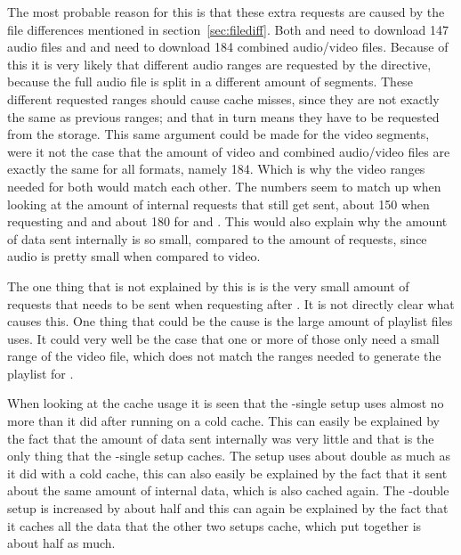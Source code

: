 \documentclass[twoside,openright]{uva-bachelor-thesis}
\begin{document}
The most probable reason for this is that these extra requests
are caused by the file differences mentioned in section~\ref{sec:filediff}.
Both \dash and \iss need to download 147 audio files and \hds and \hls need to
download 184 combined audio/video files. Because of this it is very likely that
different audio ranges are requested by the \ipplong directive, because the full
audio file is split in a different amount of segments. These different requested
ranges should cause cache misses, since they are not exactly the same as
previous ranges; and that in turn means they have to be requested from the
storage. This same argument could be made for the video segments, were it not
the case that the amount of video and combined audio/video files are exactly the
same for all formats, namely 184.  Which is why the video ranges needed for
both would match each other. The numbers seem to match up when looking at the
amount of internal requests that still get sent, about 150 when requesting \dash
and \iss and about 180 for \hds and \hls.  This would also explain why the
amount of data sent internally is so small, compared to the amount of requests,
since audio is pretty small when compared to video.

The one thing that is not explained by this is is the very small amount of
requests that needs to be sent when requesting \hls after \hds. It is not
directly clear what causes this. One thing that could be the cause is the large
amount of playlist files \hls uses. It could very well be the case that one or
more of those only need a small range of the video file, which does not match
the ranges needed to generate the playlist for \hds.

When looking at the cache usage it is seen that the \lt-single setup uses almost
no more than it did after running on a cold cache. This can easily be explained
by the fact that the amount of data sent internally was very little and that is
the only thing that the \lt-single setup caches. The \cdn setup uses about
double as much as it did with a cold cache, this can also easily be explained by
the fact that it sent about the same amount of internal data, which is also
cached again. The \lt-double setup is increased by about half and this can again
be explained by the fact that it caches all the data that the other two setups
cache, which put together is about half as much.
\end{document}
